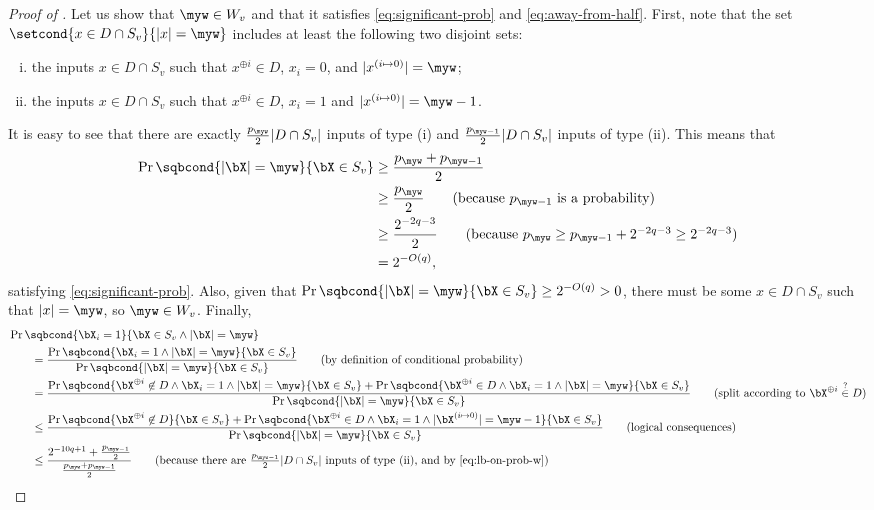 \begin{proof}[Proof of ]
Let us show that $\myw \in W_v$ and that it satisfies \eqref{eq:significant-prob} and \eqref{eq:away-from-half}.
First, note that the set $\setcond{x \in D \cap S_v}{|x| = \myw}$ includes at least the following two disjoint sets:
\begin{enumerate}[(i)]
    \item the inputs $x \in D \cap S_v$ such that $x^{\oplus i} \in D$, $x_i=0$, and $|x^{(i \mapsto 0)}|=\myw$;
    \item the inputs $x \in D \cap S_v$ such that $x^{\oplus i} \in D$, $x_i=1$ and $|x^{(i \mapsto 0)}|=\myw-1$.
\end{enumerate}
It is easy to see that there are exactly $\frac{p_\myw}{2}|D \cap S_v|$ inputs of type (i) and $\frac{p_{\myw-1}}{2}|D \cap S_v|$ inputs of type (ii).
This means that
\begin{align}
    \Pr\sqbcond{|\bX|=\myw}{\bX \in S_v}
    &\geq \frac{p_\myw + p_{\myw-1}}{2}\label{eq:lb-on-prob-w}\\
    &\geq \frac{p_\myw}{2}\tag{because $p_{\myw-1}$ is a probability}\\
    &\geq \frac{2^{-2q-3}}{2}\tag{because $p_{\myw} \geq p_{\myw-1} + 2^{-2q-3} \geq 2^{-2q-3}$}\\
    &= 2^{-O(q)},\nonumber
\end{align}
satisfying \eqref{eq:significant-prob}.
Also, given that $\Pr\sqbcond{|\bX|=\myw}{\bX \in S_v} \geq 2^{-O(q)} > 0$, there must be some $x \in D \cap S_v$ such that $|x| = \myw$, so $\myw \in W_v$.
Finally,
\begin{align*}
&\Pr\sqbcond{\bX_i=1}{\bX \in S_v \wedge |\bX|=\myw}\\
&\qquad= \frac{\Pr\sqbcond{\bX_i = 1 \wedge |\bX| = \myw}{\bX \in S_v}}{\Pr\sqbcond{|\bX| = \myw}{\bX \in S_v}}\tag{by definition of conditional probability}\\
&\qquad= \frac{\Pr\sqbcond{\bX^{\oplus i} \not\in D \wedge \bX_i = 1 \wedge |\bX| = \myw}{\bX \in S_v} + \Pr\sqbcond{\bX^{\oplus i} \in D \wedge \bX_i = 1 \wedge |\bX| = \myw}{\bX \in S_v}}{\Pr\sqbcond{|\bX| = \myw}{\bX \in S_v}}\tag{split according to $\bX^{\oplus i} \overset{?}{\in} D$}\\
&\qquad\leq \frac{\Pr\sqbcond{\bX^{\oplus i} \not\in D}{\bX \in S_v} + \Pr\sqbcond{\bX^{\oplus i} \in D \wedge \bX_i = 1 \wedge |\bX^{(i \mapsto 0)}| = \myw-1}{\bX \in S_v}}{\Pr\sqbcond{|\bX| = \myw}{\bX \in S_v}}\tag{logical consequences}\\
&\qquad\leq \frac{2^{-10q+1} + \frac{p_{\myw-1}}{2}}{\frac{p_\myw + p_{\myw-1}}{2}}\tag{because there are $\frac{p_{\myw-1}}{2}|D \cap S_v|$ inputs of type (ii), and by \eqref{eq:lb-on-prob-w}}\\

\end{align*}
\end{proof}

